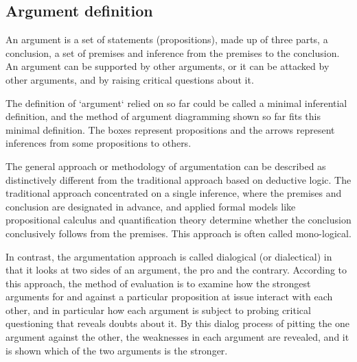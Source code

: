 \subsection{Argument definition}
\par
An argument is a set of statements (propositions), made up of three parts, a conclusion, a set of premises and inference from the premises to the conclusion. An argument can be supported by other arguments, or it can be attacked by other arguments, and by raising critical questions about it.
\par
The definition of `argument` relied on so far could be called a minimal inferential definition, and the method of argument diagramming shown so far fits this minimal definition. The boxes represent propositions and the arrows represent inferences from some propositions to others.
\par
The general approach or methodology of argumentation can be described as distinctively different from the traditional approach based on deductive logic. The traditional approach concentrated on a single inference, where the premises and conclusion are designated in advance, and applied formal models like propositional
calculus and quantification theory determine whether the conclusion conclusively follows from the premises. This approach is often called mono-logical.
\par
In contrast, the argumentation approach is called dialogical (or dialectical) in that it looks at two sides of an argument, the pro and the contrary. According to this approach, the method of evaluation is to examine how the strongest arguments for and against a particular proposition at issue interact with each other, and in particular how each argument is subject to probing critical questioning that reveals doubts about it. By this dialog process of pitting the one argument against the other, the weaknesses in each argument are revealed, and it is shown which of the two arguments is the stronger.
